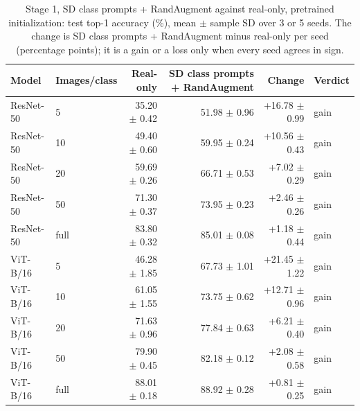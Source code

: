 \begin{table}[H]
\centering
\caption{Stage 1, SD class prompts + RandAugment against real-only, pretrained initialization: test top-1 accuracy (\%), mean $\pm$ sample SD over 3 or 5 seeds. The change is SD class prompts + RandAugment minus real-only per seed (percentage points); it is a gain or a loss only when every seed agrees in sign.}
\label{tab:stage1-pretrained-accuracy-sd_prompt_randaugment-test}
\begin{tabular}{llrrrl}
\toprule
Model & Images/class & Real-only & SD class prompts + RandAugment & Change & Verdict \\
\midrule
ResNet-50 & 5 & 35.20 $\pm$ 0.42 & 51.98 $\pm$ 0.96 & +16.78 $\pm$ 0.99 & gain \\
ResNet-50 & 10 & 49.40 $\pm$ 0.60 & 59.95 $\pm$ 0.24 & +10.56 $\pm$ 0.43 & gain \\
ResNet-50 & 20 & 59.69 $\pm$ 0.26 & 66.71 $\pm$ 0.53 & +7.02 $\pm$ 0.29 & gain \\
ResNet-50 & 50 & 71.30 $\pm$ 0.37 & 73.95 $\pm$ 0.23 & +2.46 $\pm$ 0.26 & gain \\
ResNet-50 & full & 83.80 $\pm$ 0.32 & 85.01 $\pm$ 0.08 & +1.18 $\pm$ 0.44 & gain \\
\midrule
ViT-B/16 & 5 & 46.28 $\pm$ 1.85 & 67.73 $\pm$ 1.01 & +21.45 $\pm$ 1.22 & gain \\
ViT-B/16 & 10 & 61.05 $\pm$ 1.55 & 73.75 $\pm$ 0.62 & +12.71 $\pm$ 0.96 & gain \\
ViT-B/16 & 20 & 71.63 $\pm$ 0.96 & 77.84 $\pm$ 0.63 & +6.21 $\pm$ 0.40 & gain \\
ViT-B/16 & 50 & 79.90 $\pm$ 0.45 & 82.18 $\pm$ 0.12 & +2.08 $\pm$ 0.58 & gain \\
ViT-B/16 & full & 88.01 $\pm$ 0.18 & 88.92 $\pm$ 0.28 & +0.81 $\pm$ 0.25 & gain \\
\bottomrule
\end{tabular}
\end{table}
